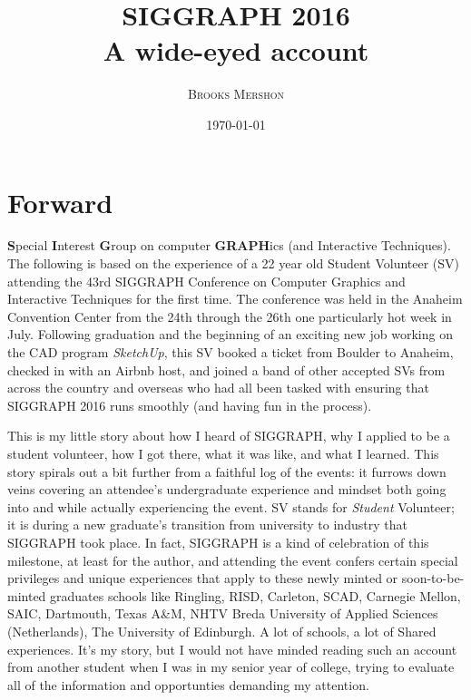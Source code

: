\documentclass[a4paper, 11pt]{article} %
\title{\textbf{SIGGRAPH 2016}\\ %
A wide-eyed account} %
\author{\textsc{Brooks Mershon}} %
\date{\today} %
\begin{document}
\maketitle %

\eject


\renewcommand{\abstractname}{Forward} %

\section*{Forward}
	
\textbf{S}pecial \textbf{I}nterest \textbf{G}roup on computer \textbf{GRAPH}ics (and Interactive Techniques). The following is based on the experience of a 22 year old Student Volunteer (SV) attending the 43rd SIGGRAPH Conference on Computer Graphics and Interactive Techniques for the first time. The conference was held in the Anaheim Convention Center from the 24th through the 26th one particularly hot week in July. Following graduation and the beginning of an exciting new job working on the CAD program \textit{SketchUp}, this SV booked a ticket from Boulder to Anaheim, checked in with an Airbnb host, and joined a band of other accepted SVs from across the country and overseas who had all been tasked with ensuring that SIGGRAPH 2016 runs smoothly (and having fun in the process).

This is my little story about how I heard of SIGGRAPH, why I applied to be a student volunteer, how I got there, what it was like, and what I learned. This story spirals out a bit further from a faithful log of the events: it furrows down veins covering an attendee's undergraduate experience and mindset both going into and while actually experiencing the event. SV stands for \textit{Student} Volunteer; it is during a new graduate's transition from university to industry that SIGGRAPH took place. In fact, SIGGRAPH is a kind of celebration of this milestone, at least for the author, and attending the event confers certain special privileges and unique experiences that apply to these newly minted or soon-to-be-minted graduates schools like Ringling, RISD, Carleton, SCAD, Carnegie Mellon, SAIC, Dartmouth, Texas A\&M, NHTV Breda University of Applied Sciences (Netherlands), The University of Edinburgh. A lot of schools, a lot of  Shared experiences. It's my story, but I would not have minded reading such an account from another student when I was in my senior year of college, trying to evaluate all of the information and opportunties demanding my attention.
\end{document}
